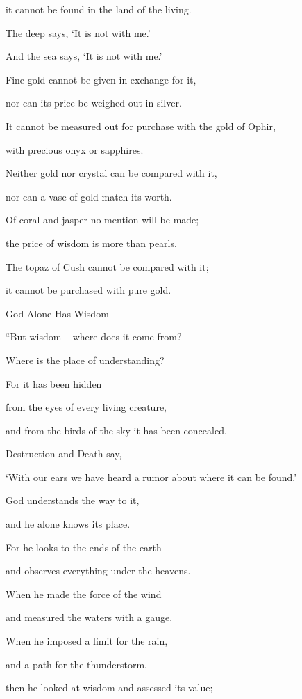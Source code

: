 {\par }{\Q it cannot
be found
in the land
of the living.
\par }{\Q {}The deep
says,
‘It is
not
with me.’
\par }{\Q And the sea
says,
‘It is not
with me.’
\par }{\Q {}Fine gold
cannot
be given
in exchange
for it,
\par }{\Q nor
can its price
be weighed
out in silver.
\par }{\Q {}It cannot
be measured out
for purchase with the gold
of Ophir,
\par }{\Q with precious
onyx
or sapphires.
\par }{\Q {}Neither
gold
nor crystal
can be compared
with it,
\par }{\Q nor can a vase
of gold
match its worth.
\par }{\Q {}Of coral
and jasper
no
mention
will be made;
\par }{\Q the price
of wisdom
is more than pearls.
\par }{\Q {}The topaz
of Cush
cannot
be compared
with it;
\par }{\Q it cannot
be purchased
with pure
gold.
\par }{\SH God Alone Has Wisdom
\par }{\Q {}“But wisdom
– where
does it come
from?

\par }{\Q Where
is
the place
of understanding?
\par }{\Q {}For it has been hidden
\par }{\Q from the eyes
of every
living creature,
\par }{\Q and from the birds
of the sky
it has been concealed.
\par }{\Q {}Destruction
and Death
say,
\par }{\Q ‘With our ears
we have heard
a rumor about where it can be found.’
\par }{\Q {}God
understands
the way
to it,
\par }{\Q and he alone knows
its place.
\par }{\Q {}For
he
looks
to the ends
of the earth
\par }{\Q and observes
everything
under
the heavens.
\par }{\Q {}When he made
the force
of the wind
\par }{\Q and measured
the waters
with a gauge.
\par }{\Q {}When
he imposed
a limit
for the rain,
\par }{\Q and a path
for the thunderstorm,
\par }{\Q {}then
he looked
at wisdom and assessed
its value;

}

